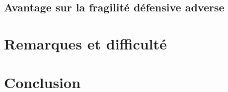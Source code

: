 \documentclass[10pt,a4paper]{report}
\begin{document}
	\subsection{Avantage sur la fragilité défensive adverse }

\section{Remarques et difficulté}

\section{Conclusion}
\end{document}
